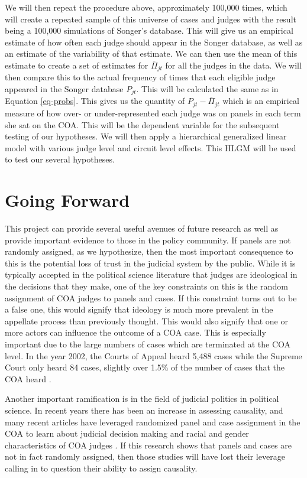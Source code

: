 \documentclass[12pt]{article}
\begin{document}
We will then repeat the procedure above, approximately 100,000 times, which will create a repeated sample of this universe of cases and judges with the result being a 100,000 simulations of Songer's database.  This will give us an empirical estimate of how often each judge should appear in the Songer database, as well as an estimate of the variability of that estimate.  We can then use the mean of this estimate to create a set of estimates for $\bar{\Pi}_{jt}$ for all the judges in the data.  We will then compare this to the actual frequency of times that each eligible judge appeared in the Songer database $P_{jt}$.  This will be calculated the same as in Equation \ref{eq-probs}.  This gives us the quantity of $P_{jt}-\bar{\Pi}_{jt}$ which is an empirical measure of how over- or under-represented each judge was on panels in each term she sat on the COA.  This will be the dependent variable for the subsequent testing of our hypotheses.  We will then apply a hierarchical generalized linear model with various judge level and circuit level effects.  This HLGM will be used to test our several hypotheses.

\section{Going Forward}\label{Further Research}
This project can provide several useful avenues of future research as well as provide important evidence to those in the policy community.  If panels are not randomly assigned, as we hypothesize, then the most important consequence to this is the potential loss of trust in the judicial system by the public.  While it is typically accepted in the political science literature that judges are ideological in the decisions that they make, one of the key constraints on this is the random assignment of COA judges to panels and cases.  If this constraint turns out to be a false one, this would signify that ideology is much more prevalent in the appellate process than previously thought.  This would also signify that one or more actors can influence the outcome of a COA case.  This is especially important due to the large numbers of cases which are terminated at the COA level.  In the year 2002, the Courts of Appeal heard 5,488 cases while the Supreme Court only heard 84 cases, slightly over 1.5\% of the number of cases that the COA heard \citep{judyearend,Songer2007}.   

Another important ramification is in the field of judicial politics in political science.  In recent years there has been an increase in assessing causality, and many recent articles have leveraged randomized panel and case assignment in the COA to learn about judicial decision making and racial and gender characteristics of COA judges \citep{Kastellec2010,Glynn2015,Farhang2014}.  If this research shows that panels and cases are not in fact randomly assigned, then those studies will have lost their leverage calling in to question their ability to assign causality.
\end{document}
